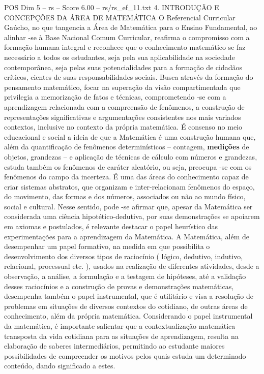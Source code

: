 \begin{textsample}{POS Dim 5 – rs – Score 6.00 – rs/rs\_ef\_11.txt}  \label{ex:f5_pos_263}
4.
INTRODUÇÃO E CONCEPÇÕES DA ÁREA DE MATEMÁTICA O Referencial Curricular Gaúcho, no que tangencia a Área de Matemática para o Ensino Fundamental, ao alinhar -se à Base Nacional Comum Curricular, reafirma o compromisso com a formação humana integral e reconhece que o conhecimento matemático se faz necessário a todos os estudantes, seja pela sua aplicabilidade na sociedade contemporânea, seja pelas suas potencialidades para a formação de cidadãos críticos, cientes de suas responsabilidades sociais.
Busca através da formação do pensamento matemático, focar na superação da visão compartimentada que privilegia a memorização de fatos e técnicas, comprometendo -se com a aprendizagem relacionada com a compreensão de fenômenos, a construção de representações significativas e argumentações consistentes nos mais variados contextos, inclusive no contexto da própria matemática.
É consenso no meio educacional e social a ideia de que a Matemática é uma construção humana que, além da quantificação de fenômenos determinísticos – contagem, \textbf{medições} de objetos, grandezas – e aplicação de técnicas de cálculo com números e grandezas, estuda também os fenômenos de caráter aleatório, ou seja, preocupa -se com os fenômenos do campo da incerteza.
É uma das áreas do conhecimento capaz de criar sistemas abstratos, que organizam e inter-relacionam fenômenos do espaço, do movimento, das formas e dos números, associados ou não ao mundo físico, social e cultural.
Nesse sentido, pode -se afirmar que, apesar da Matemática ser considerada uma ciência hipotético-dedutiva, por suas demonstrações se apoiarem em axiomas e postulados, é relevante destacar o papel heurístico das experimentações para a aprendizagem da Matemática.
A Matemática, além de desempenhar um papel formativo, na medida em que possibilita o desenvolvimento dos diversos tipos de raciocínio ( lógico, dedutivo, indutivo, relacional, processual etc. ), usados na realização de diferentes atividades, desde a observação, a análise, a formulação e a testagem de hipóteses, até a validação desses raciocínios e a construção de provas e demonstrações matemáticas, desempenha também o papel instrumental, que é utilitário e visa a resolução de problemas em situações de diversos contextos do cotidiano, de outras áreas de conhecimento, além da própria matemática.
Considerando o papel instrumental da matemática, é importante salientar que a contextualização matemática transposta da vida cotidiana para as situações de aprendizagem, resulta na elaboração de saberes intermediários, permitindo ao estudante maiores possibilidades de compreender os motivos pelos quais estuda um determinado conteúdo, dando significado a estes.

\end{textsample}
